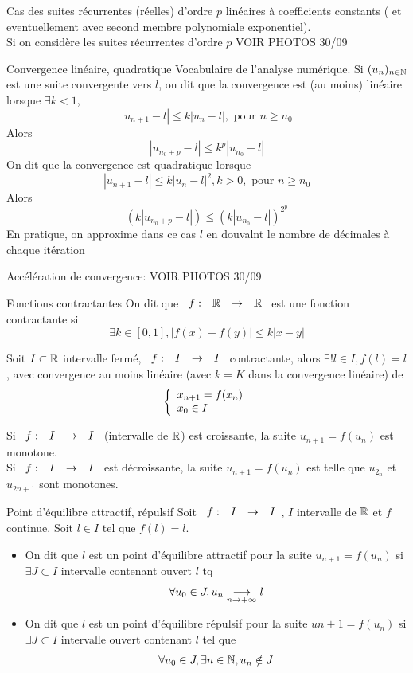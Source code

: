 \documentclass[]{report}
\begin{document}
\begin{ex}{}{}
    Cas des suites récurrentes (réelles) d'ordre $p$ linéaires à coefficients constants ( et eventuellement avec second membre polynomiale exponentiel).\\
    Si on considère les suites récurrentes d'ordre $p$
    VOIR PHOTOS 30/09
\end{ex}

\begin{df}{Convergence linéaire, quadratique}{}
    Vocabulaire de l'analyse numérique. Si $(u_n)_{n\in\mathbb{N}}$ est une suite convergente vers $l$, on dit que la convergence est (au moins) linéaire lorsque $\exists k<1$,
    \[\left|u_{n+1}-l\right|\le k \left| u_{n}-l\right|,\text{ pour $n\ge n_0$}\]
    Alors
    \[\left|u_{n_0+p}-l\right|\le k^p \left|u_{n_0}-l\right|\]
    On dit que la convergence est quadratique lorsque
    \[\left|u_{n+1}-l\right|\le k\left|u_n-l\right|^2,k>0,\text{ pour $n\ge n_0$}\]
    Alors
    \[\left(k\left|u_{n_0+p}-l\right|\right)\le \left(k\left|u_{n_0}-l\right|\right)^{2^p}\]
    En pratique, on approxime dans ce cas $l$ en douvalnt le nombre de décimales à chaque itération
\end{df}

Accélération de convergence: VOIR PHOTOS 30/09

\begin{df}{Fonctions contractantes}{}
    On dit que $\begin{array}{ccccc} f : & \mathbb{R} & \to & \mathbb{R} \end{array}$ est une fonction contractante si
    \[\exists k\in[0,1],\left|f(x)-f(y)\right|\le k\left| x-y\right|\]
\end{df}

\begin{tm}{}{}
    Soit $I\subset \mathbb{R}$ intervalle fermé, $\begin{array}{ccccc} f : & I & \to & I \end{array}$ contractante, alors $\exists!l\in I,f(l)=l$, avec convergence au moins linéaire (avec $k=K$ dans la convergence linéaire) de
    \[\left\{\begin{array}{ll} x_{n+1}=f(x_n)\\ x_0\in I \end{array} \right.\]
\end{tm}

\begin{prop}{}{}
    Si $\begin{array}{ccccc} f : & I & \to & I \end{array}$ (intervalle de $\mathbb{R}$) est croissante, la suite $u_{n+1}=f(u_n)$ est monotone.\\
    Si $\begin{array}{ccccc} f : & I & \to & I \end{array}$ est décroissante, la suite $u_{n+1}=f(u_n)$ est telle que $u_{2_n}$ et $u_{2n+1}$ sont monotones.
\end{prop}

\begin{df}{Point d'équilibre attractif, répulsif}{}
    Soit $\begin{array}{ccccc} f : & I & \to & I \end{array}$, $I$ intervalle de $\mathbb{R}$ et $f$ continue. Soit $l\in I$ tel que $f(l)=l$.
    \begin{itemize}
        \item On dit que $l$ est un point d'équilibre attractif pour la suite $u_{n+1}=f(u_n)$ si $\exists J\subset I$ intervalle contenant ouvert $l$ tq
        \[\forall u_0\in J,u_n\underset{n\to +\infty}{\longrightarrow} l\]
        \item On dit que $l$ est un point d'équilibre répulsif pour la suite $u{n+1}=f(u_n)$ si $\exists J\subset I$ intervalle ouvert contenant $l$ tel que
        \[\forall u_0\in J,\exists n\in \mathbb{N}, u_n\notin J\]
    \end{itemize}
\end{df}
\end{document}
